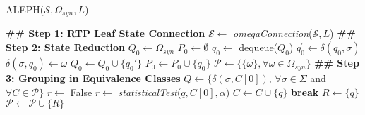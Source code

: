 {%
%
\begin{algorithm}
  \caption{ALEPH($\mathcal{S}, \Omega_{syn}, L$)\label{alg:aleph}}
    \begin{algorithmic}[1]
      \Procedure{}{}
      	\State \textbf{\#\# Step 1: RTP Leaf State Connection}
      		\State $\mathcal{S} \gets$ \textit{omegaConnection}($\mathcal{S}, L$)
      	\State \textbf{\#\# Step 2: State Reduction}
	      	\State $Q_0 \gets \Omega_{syn}$
	      	\State $P_0 \gets \emptyset$
	      		\State $q_0 \gets$ dequeue($Q_0$)
	      		\For{$\sigma \in \Sigma$}
	      			\State $q_0^{\prime} \gets \delta(q_0,\sigma)$
	      				\State $\delta(\sigma,q_0) \gets \omega$
	      			\Else
	      					\State $Q_0 \gets Q_0\cup\{q_0'\}$
	      				\EndIf 
	      			\EndIf
	      			\State $P_0 \gets P_0\cup\{q_0\}$
	      		\EndFor
	      	\EndWhile	      	
      		\State $\mathcal{P} \gets \{\{\omega\}, \forall \omega \in \Omega_{syn}\}$
      	\State \textbf{\#\# Step 3: Grouping in Equivalence Classes}
      	\State $Q \gets \{\delta(\sigma, C[0]), \, \forall \sigma \in \Sigma$ and $\forall C\in \mathcal{P}\}$
      		\State $r \gets$ False
      			\State $r \gets$ \textit{statisticalTest}($q, C[0], \alpha$)
      				\State $C \gets C\cup\{q\}$
      				\State \textbf{break}
      			\EndIf
      		\EndFor
      			\State $R \gets \{q\}$
      			\State $\mathcal{P} \gets \mathcal{P}\cup\{R\}$

\end{algorithmic}
\end{algorithm}}
